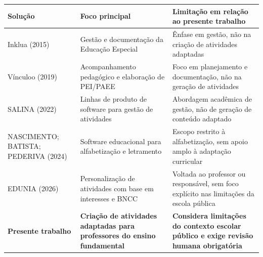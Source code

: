 \begin{quadro}[H]

    \begin{center}
    \caption{Lacuna identificada em relação aos trabalhos correlatos.}\label{qua:quaexe}
        \begin{tabular}{|p{3cm}|p{4.5cm}|p{6cm}|}
            \hline
            \textbf{Solução} & \textbf{Foco principal} & \textbf{Limitação em relação ao presente trabalho} \\
            \hline
            Inklua (2015) & Gestão e documentação da Educação Especial & Ênfase em gestão, não na criação de atividades adaptadas \\
            \hline
            Vínculoo (2019) & Acompanhamento pedagógico e elaboração de PEI/PAEE & Foco em planejamento e documentação, não na geração de atividades \\
            \hline
            SALINA (2022) & Linhas de produto de software para gestão de atividades & Abordagem acadêmica de gestão, não de geração de conteúdo adaptado \\
            \hline
            NASCIMENTO; BATISTA; PEDERIVA (2024) & Software educacional para alfabetização e letramento & Escopo restrito à alfabetização, sem apoio amplo à adaptação curricular \\
            \hline
            EDUNIA (2026) & Personalização de atividades com base em interesses e BNCC & Voltada ao professor ou responsável, sem foco explícito nas limitações da escola pública \\
            \hline
            \textbf{Presente trabalho} & \textbf{Criação de atividades adaptadas para professores do ensino fundamental} & \textbf{Considera limitações do contexto escolar público e exige revisão humana obrigatória} \\
            \hline
        \end{tabular}
        {\raggedright {}}
    \end{center}
    \vspace*{-0,8cm}

\end{quadro}